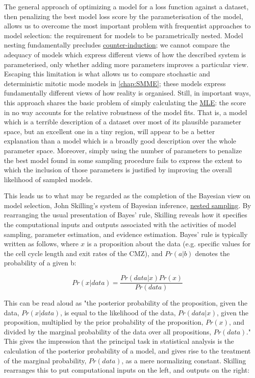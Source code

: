 The general approach of optimizing a model for a loss function against a dataset, then penalizing the best model loss score by the parameterisation of the model, allows us to overcome the most important problem with frequentist approaches to model selection: the requirement for models to be parametrically nested. Model nesting fundamentally precludes \hyperref[sec:Feyerabend]{counter-induction}; we cannot compare the adequacy of models which express different views of how the described system is parameterised, only whether adding more parameters improves a particular view. Escaping this limitation is what allows us to compare stochastic and deterministic mitotic mode models in \autoref{chap:SMME}; these models express fundamentally different views of how reality is organised. Still, in important ways, this approach shares the basic problem of simply calculating the \hyperref[MLE]{MLE}: the score in no way accounts for the relative robustness of the model fits. That is, a model which is a terrible description of a dataset over most of its plausible parameter space, but an excellent one in a tiny region, will appear to be a better explanation than a model which is a broadly good description over the whole parameter space. Moreover, simply using the number of parameters to penalize the best model found in some sampling procedure fails to express the extent to which the inclusion of those parameters is justified by improving the overall likelihood of sampled models.

This leads us to what may be regarded as the completion of the Bayesian view on model selection, John Skilling's system of Bayesian inference, \hyperref[sec:nested]{nested sampling}\cite{Skilling2006,Skilling2012,Skilling2019}. By rearranging the usual presentation of Bayes' rule, Skilling reveals how it specifies the computational inputs and outputs associated with the activities of model sampling, parameter estimation, and evidence estimation. Bayes' rule is typically written as follows, where $x$ is a proposition about the data (e.g. specific values for the cell cycle length and exit rates of the CMZ), and $Pr(a|b)$ denotes the probability of a given b:

\[Pr(x|data) = \frac{Pr(data|x)Pr(x)}{Pr(data)}\]

This can be read aloud as "the posterior probability of the proposition, given the data, $Pr(x|data)$, is equal to the likelihood of the data, $Pr(data|x)$, given the proposition, multiplied by the prior probability of the proposition, $Pr(x)$, and divided by the marginal probability of the data over all propositions, $Pr(data)$." This gives the impression that the principal task in statistical analysis is the calculation of the posterior probability of a model, and gives rise to the treatment of the marginal probability, $Pr(data)$, as a mere normalizing constant. Skilling rearranges this to put computational inputs on the left, and outputs on the right:

